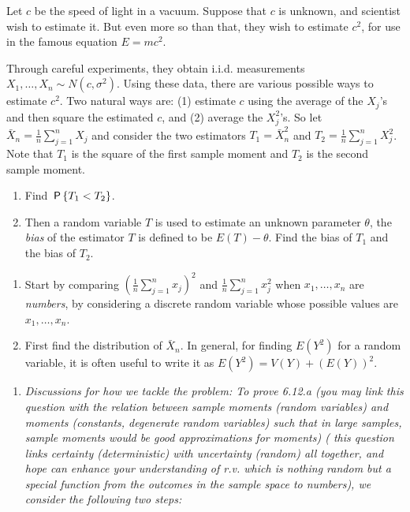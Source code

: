 
\setcounter{theorem}{11}
\begin{exercise} [BH.6.12]
    Let $c$ be the speed of light in a vacuum. Suppose that $c$ is unknown, and scientist wish to estimate it. But even more so than that, they wish to estimate $c^2$, for use in the famous equation $E = mc^2$.
	
	Through careful experiments, they obtain i.i.d. measurements $X_1, \ldots, X_n \sim N(c, \sigma^2)$. Using these data, there are various possible ways to estimate $c^2$. Two natural ways are: (1) estimate $c$ using the average of the $X_j$'s and then square the estimated $c$, and (2) average the $X_j^2$'s. So let $\bar{X}_n = \frac{1}{n} \sum_{j = 1}^n X_j$ and consider the two estimators $T_1 = \bar{X}_n^2$ and $T_2 = \frac{1}{n} \sum_{j = 1}^n X_j^2$. Note that $T_1$ is the square of the first sample moment and $T_2$ is the second sample moment.
	\begin{enumerate}
		\item Find $\P{T_1 < T_2}$.
		\item Then a random variable $T$ is used to estimate an unknown parameter $\theta$, the \emph{bias} of the estimator $T$ is defined to be $E(T) - \theta$. Find the bias of $T_1$ and the bias of $T_2$.
	\end{enumerate}
	\begin{hint}
		\begin{enumerate}
			\item Start by comparing $\left(\frac{1}{n} \sum_{j = 1}^n x_j\right)^2$ and $\frac{1}{n} \sum_{j = 1}^n x_j^2$ when $x_1, \ldots, x_n$ are \emph{numbers}, by considering a discrete random variable whose possible values are $x_1, \ldots, x_n$.
			\item First find the distribution of $\bar{X}_n$. In general, for finding $E(Y^2)$ for a random variable, it is often useful to write it as $E(Y^2) = V(Y) + (E(Y))^2$.
		\end{enumerate}
	\end{hint}
\begin{solution}
    \begin{enumerate}
		\item \textit{Discussions for how we tackle the problem: To prove 6.12.a (you may link this question with the relation between sample moments (random variables) and moments (constants, degenerate random variables) such that in large samples, sample  moments would be good approximations for moments) ({ this question links certainty (deterministic) with uncertainty (random) all together, and hope can enhance your understanding of r.v. which is nothing random but a special function from the outcomes in the sample space to numbers}), we consider the following two steps:
}
\end{enumerate}
\end{solution}
\end{exercise}
